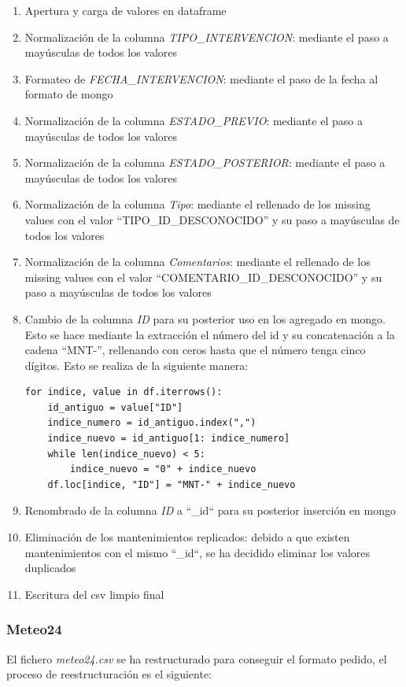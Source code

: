 \documentclass[]{article}
\begin{document}
\begin{enumerate}
    \item Apertura y carga de valores en dataframe
    \item Normalización de la columna \textit{TIPO\_INTERVENCION}: mediante el paso a mayúsculas de todos los valores
    \item Formateo de \textit{FECHA\_INTERVENCION}: mediante el paso de la fecha al formato de mongo
    \item Normalización de la columna \textit{ESTADO\_PREVIO}: mediante el paso a mayúsculas de todos los valores
    \item Normalización de la columna \textit{ESTADO\_POSTERIOR}: mediante el paso a mayúsculas de todos los valores
    \item Normalización de la columna \textit{Tipo}: mediante el rellenado de los missing values con el valor ``TIPO\_ID\_DESCONOCIDO'' y su paso a mayúsculas de todos los valores
    \item Normalización de la columna \textit{Comentarios}: mediante el rellenado de los missing values con el valor ``COMENTARIO\_ID\_DESCONOCIDO'' y su paso a mayúsculas de todos los valores
    \item Cambio de la columna \textit{ID} para su posterior uso en los agregado en mongo. Esto se hace mediante la extracción el número del id y su concatenación a la cadena ``MNT-'', rellenando con ceros hasta que el número tenga cinco dígitos. Esto se realiza de la siguiente manera:

\begin{lstlisting}
for indice, value in df.iterrows():
    id_antiguo = value["ID"]
    indice_numero = id_antiguo.index(",")
    indice_nuevo = id_antiguo[1: indice_numero]
    while len(indice_nuevo) < 5:
        indice_nuevo = "0" + indice_nuevo
    df.loc[indice, "ID"] = "MNT-" + indice_nuevo
\end{lstlisting}

    \item Renombrado de la columna \textit{ID} a ``\_id`` para su posterior inserción en mongo
    \item Eliminación de los mantenimientos replicados: debido a que existen mantenimientos con el mismo ``\_id``, se ha decidido eliminar los valores duplicados
    \item Escritura del csv limpio final
\end{enumerate}

\subsubsection{Meteo24}
\label{subsubsec:preprocessmeteo}
El fichero \textit{meteo24.csv} se ha restructurado para conseguir el formato pedido, el proceso de reestructuración es el siguiente:
\end{document}
